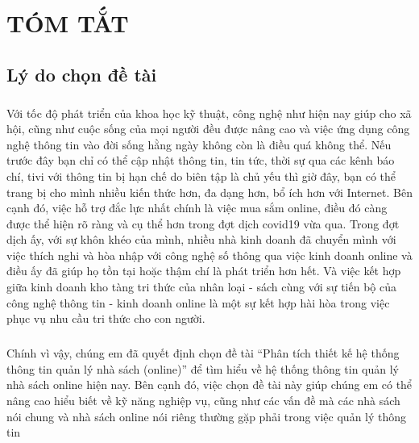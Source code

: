 \documentclass{report}
\begin{document}
\fontsize{13}{20}\selectfont
\listoftables
\pagebreak

\fontsize{13}{20}\selectfont
\listoffigures
\pagebreak

\setcounter{page}{1}
\fontsize{18}{10}\selectfont
\chapter{TÓM TẮT}
\fontsize{16}{10}\selectfont
\section{Lý do chọn đề tài}
\paragraph{}
\fontsize{13}{10}\selectfont
    Với tốc độ phát triển của khoa học kỹ thuật, công nghệ như hiện nay giúp cho xã hội, cũng như cuộc sống của mọi người đều được nâng cao và việc ứng dụng công nghệ thông tin vào đời sống hằng ngày không còn là điều quá không thể. Nếu trước đây bạn chỉ có thể cập nhật thông tin, tin tức, thời sự qua các kênh báo chí, tivi với thông tin bị hạn chế do biên tập là chủ yếu thì giờ đây, bạn có thể trang bị cho mình nhiều kiến thức hơn, đa dạng hơn, bổ ích hơn với Internet. Bên cạnh đó, việc hỗ trợ đắc lực nhất chính là việc mua sắm online, điều đó càng được thể hiện rõ ràng và cụ thể hơn trong đợt dịch covid19 vừa qua. Trong đợt dịch ấy, với sự khôn khéo của mình, nhiều nhà kinh doanh đã chuyển mình với việc thích nghi và hòa nhập với công nghệ số thông qua việc kinh doanh online và điều ấy đã giúp họ tồn tại hoặc thậm chí là phát triển hơn hết. Và việc kết hợp giữa kinh doanh kho tàng tri thức của nhân loại - sách cùng với sự tiến bộ của công nghệ thông tin - kinh doanh online là một sự kết hợp hài hòa trong việc phục vụ nhu cầu tri thức cho con người.
\paragraph{}
    Chính vì vậy, chúng em đã quyết định chọn đề tài “Phân tích thiết kế hệ thống thông tin quản lý nhà sách (online)” để tìm hiểu về hệ thống thông tin quản lý nhà sách online hiện nay. Bên cạnh đó, việc chọn đề tài này giúp chúng em có thể nâng cao hiểu biết về kỹ năng nghiệp vụ, cũng như các vấn đề mà các nhà sách nói chung và nhà sách online nói riêng thường gặp phải trong việc quản lý thông tin
\end{document}
